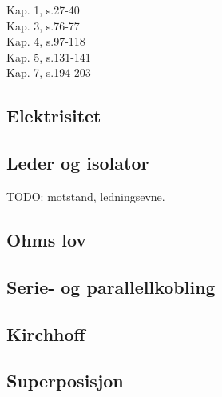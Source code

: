 Kap. 1, s.27-40 \\
Kap. 3, s.76-77 \\
Kap. 4, s.97-118 \\
Kap. 5, s.131-141 \\
Kap. 7, s.194-203

\subsection{Elektrisitet}




\subsection{Leder og isolator}


TODO: motstand, ledningsevne.

\subsection{Ohms lov}


\subsection{Serie- og parallellkobling}


\subsection{Kirchhoff}


\subsection{Superposisjon}

